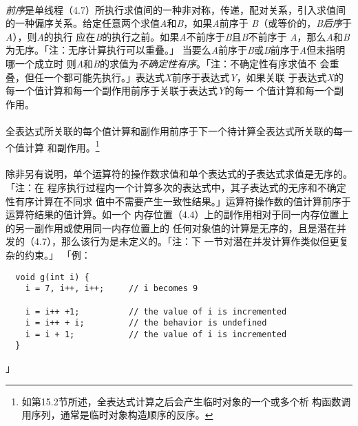 \paragraph{}
\textit{前序}是单线程（4.7）所执行求值间的一种非对称，传递，配对关系，引入求值间
的一种偏序关系。给定任意两个求值\textit{A}和\textit{B}，如果\textit{A}前序于
\textit{B}（或等价的，\textit{B}\textit{后序}于\textit{A}），则\textit{A}的执行
应在\textit{B}的执行之前。如果\textit{A}不前序于\textit{B}且\textit{B}不前序于
\textit{A}，那么\textit{A}和\textit{B}为无序。「注：无序计算执行可以重叠。」
当要么\textit{A}前序于\textit{B}或\textit{B}前序于\textit{A}但未指明哪一个成立时
则\textit{A}和\textit{B}的求值为\textit{不确定性有序}。「注：不确定性有序求值不
会重叠，但任一个都可能先执行。」表达式\textit{X}前序于表达式\textit{Y}，如果关联
于表达式\textit{X}的每一个值计算和每一个副作用前序于关联于表达式\textit{Y}的每一
个值计算和每一个副作用。

\paragraph{}
全表达式所关联的每个值计算和副作用前序于下一个待计算全表达式所关联的每一个值计算
和副作用。\footnote{如第15.2节所述，全表达式计算之后会产生临时对象的一个或多个析
构函数调用序列，通常是临时对象构造顺序的反序。}

\paragraph{}
除非另有说明，单个运算符的操作数求值和单个表达式的子表达式求值是无序的。「注：在
程序执行过程内一个计算多次的表达式中，其子表达式的无序和不确定性有序计算在不同求
值中不需要产生一致性结果。」运算符操作数的值计算前序于运算符结果的值计算。如一个
内存位置（4.4）上的副作用相对于同一内存位置上的另一副作用或使用同一内存位置上的
任何对象值的计算是无序的，且是潜在并发的（4.7），那么该行为是未定义的。「注：下
一节对潜在并发计算作类似但更复杂的约束。」
「例：
\begin{lstlisting}
  void g(int i) {
    i = 7, i++, i++;     // i becomes 9

    i = i++ +1;          // the value of i is incremented
    i = i++ + i;         // the behavior is undefined
    i = i + 1;           // the value of i is incremented
  }
\end{lstlisting}
」

